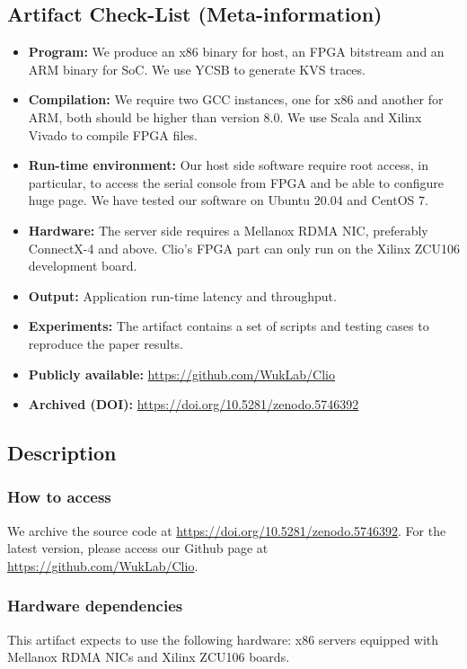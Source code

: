 \subsection{Artifact Check-List (Meta-information)}
{\small
\begin{itemize}
  \item {\bf Program: }We produce an x86 binary for host, an FPGA bitstream and an ARM binary for SoC. We use YCSB to generate KVS traces.
  \item {\bf Compilation: }We require two GCC instances, one for x86 and another for ARM, both should be higher than version 8.0. We use Scala and Xilinx Vivado to compile FPGA files.
  \item {\bf Run-time environment: } Our host side software require root access, in particular, to access the serial console from FPGA and be able to configure huge page. We have tested our software on Ubuntu 20.04 and CentOS 7.
  \item {\bf Hardware: }The server side requires a Mellanox RDMA NIC, preferably ConnectX-4 and above. Clio's FPGA part can only run on the Xilinx ZCU106 development board.
  \item {\bf Output: }Application run-time latency and throughput.
  \item {\bf Experiments: }The artifact contains a set of scripts and testing cases to reproduce the paper results.
  \item {\bf Publicly available: }\url{https://github.com/WukLab/Clio}
  \item {\bf Archived (DOI): }\url{https://doi.org/10.5281/zenodo.5746392}
\end{itemize}
}

\subsection{Description}

\subsubsection{How to access}
We archive the source code at \url{https://doi.org/10.5281/zenodo.5746392}.
For the latest version, please access our Github page at \url{https://github.com/WukLab/Clio}.

\subsubsection{Hardware dependencies}
This artifact expects to use the following hardware:
x86 servers equipped with Mellanox RDMA NICs and Xilinx ZCU106 boards.

